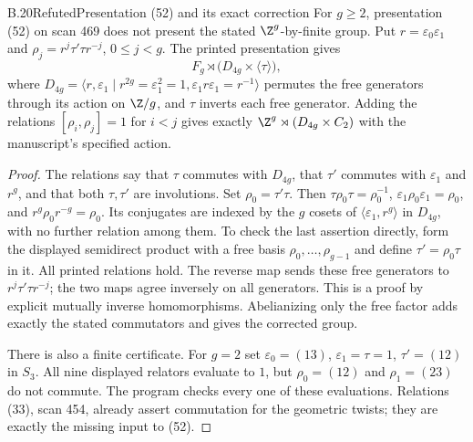\begin{claim}{B.20}{Refuted}{Presentation (52) and its exact correction}
For $g\ge2$, presentation (52) on scan 469 does not present the stated
$\Z^g$-by-finite group. Put $r=\varepsilon_0\varepsilon_1$ and
$\rho_j=r^j\tau'\tau r^{-j}$, $0\le j<g$. The printed presentation gives
\[
 F_g\rtimes\bigl(D_{4g}\times\langle\tau\rangle\bigr),
\]
where $D_{4g}=\langle r,\varepsilon_1\mid r^{2g}=\varepsilon_1^2=1,
\varepsilon_1r\varepsilon_1=r^{-1}\rangle$ permutes the free generators through
its action on $\Z/g$, and $\tau$ inverts each free generator.
Adding the relations $[\rho_i,\rho_j]=1$ for $i<j$ gives exactly
$\Z^g\rtimes(D_{4g}\times C_2)$ with the manuscript's specified action.
\end{claim}
\begin{proof}
The relations say that $\tau$ commutes with $D_{4g}$, that $\tau'$ commutes
with $\varepsilon_1$ and $r^g$, and that both $\tau,\tau'$ are involutions.
Set $\rho_0=\tau'\tau$. Then $\tau\rho_0\tau=\rho_0^{-1}$,
$\varepsilon_1\rho_0\varepsilon_1=\rho_0$, and
$r^g\rho_0r^{-g}=\rho_0$. Its conjugates are indexed by the $g$ cosets of
$\langle\varepsilon_1,r^g\rangle$ in $D_{4g}$, with no further relation among
them. To check the last assertion directly, form the displayed semidirect
product with a free basis $\rho_0,\ldots,\rho_{g-1}$ and define
$\tau'=\rho_0\tau$ in it. All printed relations hold. The reverse map sends
these free generators to $r^j\tau'\tau r^{-j}$; the two maps agree inversely
on all generators. This is a proof by explicit mutually inverse homomorphisms.
Abelianizing only the free factor adds exactly the stated commutators and gives
the corrected group.

There is also a finite certificate. For $g=2$ set
$\varepsilon_0=(13)$, $\varepsilon_1=\tau=1$, $\tau'=(12)$ in $S_3$.
All nine displayed relators evaluate to $1$, but
$\rho_0=(12)$ and $\rho_1=(23)$ do not commute. The program checks every one
of these evaluations. Relations (33), scan 454, already assert commutation
for the geometric twists; they are exactly the missing input to (52).
\end{proof}

